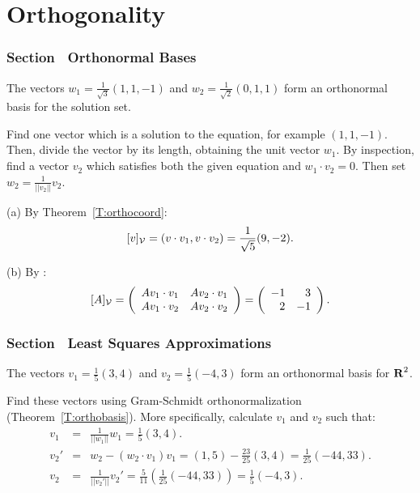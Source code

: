 \chapter{Orthogonality}

\subsection*{Section~\protect{\ref{S:orthonormal}} Orthonormal Bases}

\ans The vectors $w_1 = \frac{1}{\sqrt{3}}(1,1,-1)$ and
$w_2 = \frac{1}{\sqrt{2}}(0,1,1)$ form an orthonormal basis
for the solution set.

\soln Find one vector which is a solution to the equation, for
example $(1,1,-1)$.  Then, divide the vector by its length, obtaining
the unit vector $w_1$.  By inspection, find a vector $v_2$ which
satisfies both the given equation and $w_1 \cdot v_2 = 0$.  Then set
$w_2 = \frac{1}{||v_2||}v_2$.

(a) By Theorem~\ref{T:orthocoord}:
\[
[v]_{\cal V} = (v \cdot v_1, v \cdot v_2) = 
\frac{1}{\sqrt{5}}(9,-2).
\]

(b) By :
\[ [A]_{\cal V} = \left(\begin{array}{rr} Av_1 \cdot v_1 & Av_2 \cdot v_1\\ Av_1 \cdot v_2 &Av_2 \cdot v_2\end{array}\right) = \left(\begin{array}{rr} -1 & 3\\ 2 &-1\end{array}\right). \]



\subsection*{Section~\protect{\ref{S:LSA}} Least Squares Approximations}

\ans The vectors $v_1 = \frac{1}{5}(3,4)$ and $v_2 = \frac{1}{5}(-4,3)$
form an orthonormal basis for $\mbox{$\bf{R}$}^2$.

\soln Find these vectors using Gram-Schmidt orthonormalization
(Theorem~\ref{T:orthobasis}).  More
specifically, calculate $v_1$ and $v_2$ such that:
\[
\begin{array}{rcl}
v_1 & = & \frac{1}{||w_1||}w_1 = \frac{1}{5}(3,4). \\
v_2' & = & w_2 - (w_2 \cdot v_1)v_1 = (1,5) - \frac{23}{25}(3,4)
= \frac{1}{25}(-44,33). \\
v_2 & = & \frac{1}{||v_2'||}v_2' = \frac{5}{11}
\left(\frac{1}{25}(-44,33)\right) = \frac{1}{5}(-4,3).
\end{array}
\]

